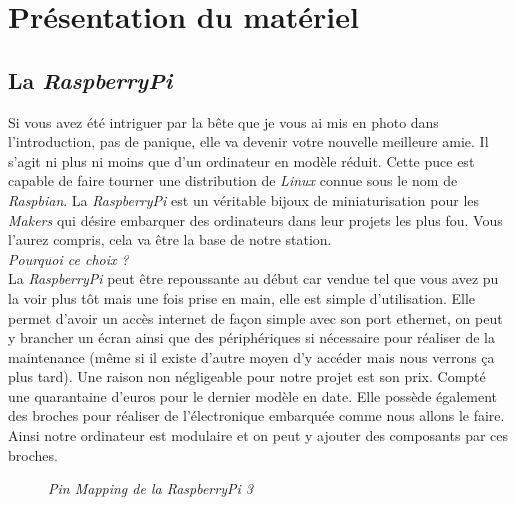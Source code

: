 \chapter{Présentation du matériel}

\section{La \textit{RaspberryPi}}

Si vous avez été intriguer par la bête que je vous ai mis en photo dans l'introduction, pas de panique, elle va devenir votre nouvelle meilleure amie. Il s'agit ni plus ni moins que d'un ordinateur en modèle réduit.
Cette puce est capable de faire tourner une distribution de \textit{Linux} connue sous le nom de \textit{Raspbian}. La \textit{RaspberryPi} est un véritable bijoux de miniaturisation pour les \textit{Makers} qui désire embarquer des ordinateurs dans leur projets les plus fou. Vous l'aurez compris, cela va être la base de notre station.\\

\textit{Pourquoi ce choix ? }\\

La \textit{RaspberryPi} peut être repoussante au début car vendue tel que vous avez pu la voir  plus tôt mais une fois prise en main, elle est simple d'utilisation. Elle permet d'avoir un accès internet de façon simple avec son port ethernet, on peut y brancher un écran ainsi que des périphériques si nécessaire pour réaliser de la maintenance (même si il existe d'autre moyen d'y accéder mais nous verrons ça plus tard). 
Une raison non négligeable pour notre projet est son prix. Compté une quarantaine d'euros pour le dernier modèle en date.
Elle possède également des broches pour réaliser de l'électronique embarquée comme nous allons le faire. Ainsi notre ordinateur est modulaire et on peut y ajouter des composants par ces broches.\\

\begin{figure}[H]
\begin{center}
\end{center}
	\caption{ \textit{Pin Mapping de la RaspberryPi 3}}
\end{figure}\\

